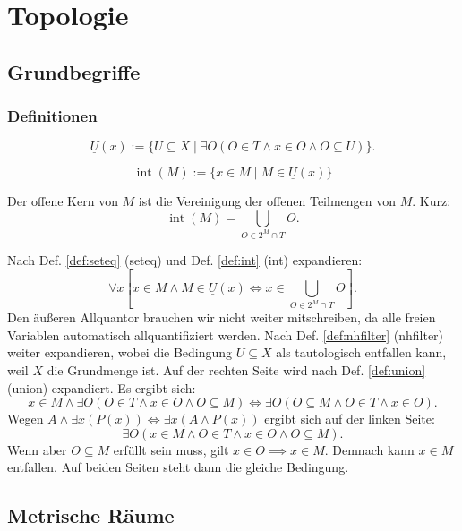 
\chapter{Topologie}
\section{Grundbegriffe}
\subsection{Definitionen}

\begin{Definition}\label{def:nhfilter}
\[\underline U(x) := \{U{\subseteq}X\mid
\exists O(O\in T\land x\in O\land O\subseteq U)\}.\]
\end{Definition}

\begin{Definition}\label{def:int}
\[\operatorname{int}(M) := \{x\in M\mid M\in \underline U(x)\}\]
\end{Definition}

\begin{Satz}
Der offene Kern von $M$ ist die Vereinigung der offenen Teilmengen
von $M$. Kurz:%
\[\operatorname{int}(M) = \bigcup_{O\in 2^M\cap T} O.\]
\end{Satz}

\begin{Beweis}
Nach Def. \ref{def:seteq} (seteq) und Def. \ref{def:int} (int)
expandieren:
\[\forall x[x\in M\land M\in\underline U(x)
\iff x\in\bigcup_{O\in 2^M\cap T} O].\]
Den äußeren Allquantor brauchen wir nicht weiter mitschreiben, da alle
freien Variablen automatisch allquantifiziert werden.
Nach Def. \ref{def:nhfilter} (nhfilter) weiter expandieren, wobei die
Bedingung $U\subseteq X$ als tautologisch entfallen kann,
weil $X$ die Grundmenge ist. Auf der rechten Seite wird nach Def.
\ref{def:union} (union) expandiert. Es ergibt sich:
\[x\in M\land \exists O(O\in T\land x\in O\land O\subseteq M)
\iff \exists O(O\subseteq M\land O\in T\land x\in O).\]
Wegen $A\land\exists x(P(x))\iff \exists x(A\land P(x))$ ergibt
sich auf der linken Seite:
\[\exists O(x\in M\land O\in T\land x\in O\land O\subseteq M).\]
Wenn aber $O\subseteq M$ erfüllt sein muss, gilt
$x\in O\implies x\in M$. Demnach kann $x\in M$ entfallen.
Auf beiden Seiten steht dann die gleiche Bedingung.\,\qedsymbol
\end{Beweis}

\section{Metrische Räume}
